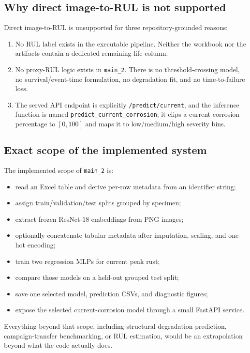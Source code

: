 \documentclass[11pt]{article}
\begin{document}
\subsection{Why direct image-to-RUL is not supported}
Direct image-to-RUL is unsupported for three repository-grounded reasons:
\begin{enumerate}
  \item No RUL label exists in the executable pipeline. Neither the workbook nor the artifacts contain a dedicated remaining-life column.
  \item No proxy-RUL logic exists in \texttt{main\_2}. There is no threshold-crossing model, no survival/event-time formulation, no degradation fit, and no time-to-failure loss.
  \item The served API endpoint is explicitly \texttt{/predict/current}, and the inference function is named \texttt{predict\_current\_corrosion}; it clips a current corrosion percentage to \([0,100]\) and maps it to low/medium/high severity bins.
\end{enumerate}

\subsection{Exact scope of the implemented system}
The implemented scope of \texttt{main\_2} is:
\begin{itemize}
  \item read an Excel table and derive per-row metadata from an identifier string;
  \item assign train/validation/test splits grouped by specimen;
  \item extract frozen ResNet-18 embeddings from PNG images;
  \item optionally concatenate tabular metadata after imputation, scaling, and one-hot encoding;
  \item train two regression MLPs for current peak rust;
  \item compare those models on a held-out grouped test split;
  \item save one selected model, prediction CSVs, and diagnostic figures;
  \item expose the selected current-corrosion model through a small FastAPI service.
\end{itemize}

Everything beyond that scope, including structural degradation prediction, campaign-transfer benchmarking, or RUL estimation, would be an extrapolation beyond what the code actually does.
\end{document}
